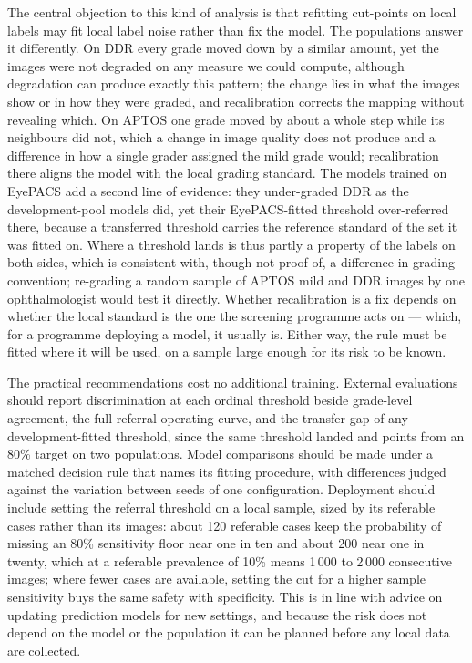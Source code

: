 The central objection to this kind of analysis is that refitting cut-points on local labels may
fit local label noise rather than fix the model. The populations answer it differently. On DDR every
grade moved down by a similar amount, yet the images were not degraded on any measure we could
compute, although degradation can produce exactly this pattern; the change lies in what the images
show or in how they were graded, and recalibration corrects the mapping without revealing which. On
APTOS one grade moved by about a whole step while its neighbours did not, which a change in image
quality does not produce and a difference in how a single grader assigned the mild grade would;
recalibration there aligns the model with the local grading standard. The models trained on EyePACS
add a second line of evidence: they under-graded DDR as the development-pool models did, yet their
EyePACS-fitted threshold over-referred there, because a transferred threshold carries the reference
standard of the set it was fitted on. Where a threshold lands is thus partly a property of the
labels on both sides, which is consistent with, though not proof of, a difference in grading
convention; re-grading a random sample of APTOS mild and DDR images by one ophthalmologist would
test it directly. Whether recalibration is a fix depends on whether the local standard is the one
the screening programme acts on --- which, for a programme deploying a model, it usually is. Either
way, the rule must be fitted where it will be used, on a sample large enough for its risk to be
known.

The practical recommendations cost no additional training. External evaluations should report
discrimination at each ordinal threshold beside grade-level agreement, the full referral operating
curve, and the transfer gap of any development-fitted threshold, since the same threshold landed
 and  points from an 80\% target on two populations.
Model comparisons should be made under a matched decision rule that names its fitting procedure,
with differences judged against the variation between seeds of one configuration. Deployment
should include setting the referral threshold on a local sample, sized by its referable cases
rather than its images: about 120 referable cases keep the probability of missing an 80\%
sensitivity floor near one in ten and about 200 near one in twenty, which at a referable prevalence
of 10\% means 1\,000 to 2\,000 consecutive images; where fewer cases are available, setting the cut
for a higher sample sensitivity buys the same safety with specificity. This is in line with advice
on updating prediction models for new
settings\cite{janssen2008updating,vergouwe2017updating,riley2021samplesize}, and because the risk
does not depend on the model or the population it can be planned before any local data are
collected.

